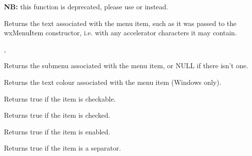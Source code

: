 {\bf NB:} this function is deprecated, please use 
 or  
instead.


\label{wxmenuitemgettext}


Returns the text associated with the menu item, such as it was passed to the
wxMenuItem constructor, i.e. with any accelerator characters it may contain.


, 


\label{wxmenuitemgetsubmenu}


Returns the submenu associated with the menu item, or NULL if there isn't one.


\label{wxmenuitemgettextcolour}


Returns the text colour associated with the menu item (Windows only).


\label{wxmenuitemischeckable}


Returns true if the item is checkable.


\label{wxmenuitemischecked}


Returns true if the item is checked.


\label{wxmenuitemisenabled}


Returns true if the item is enabled.


\label{wxmenuitemisseparator}


Returns true if the item is a separator.


\label{wxmenuitemissubmenu}



